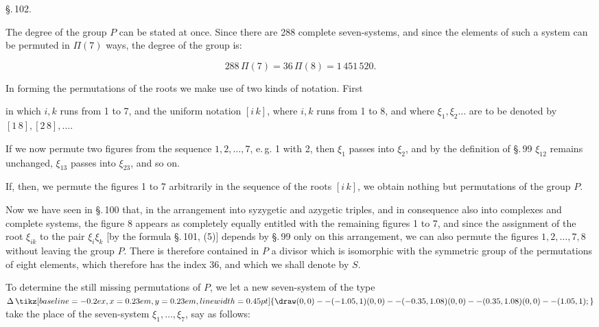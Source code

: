 \providecommand{\weberfourup}{\mathord{\tikz[baseline=-0.2ex,x=0.23em,y=0.23em,line width=0.45pt]{\draw (0,0)--(-1.05,1) (0,0)--(-0.35,1.08) (0,0)--(0.35,1.08) (0,0)--(1.05,1);}}}
\begin{center}
\S.\,102.

\end{center}

The degree of the group $P$ can be stated at once. Since there are 288 complete seven-systems, and since the elements of such a system can be permuted in $\Pi(7)$ ways, the degree of the group is:

\[
288\,\Pi(7) = 36\,\Pi(8) = 1\,451\,520.
\]

In forming the permutations of the roots we make use of two kinds of notation. First


in which $i,k$ runs from 1 to 7, and the uniform notation $[i\,k]$, where $i,k$ runs from 1 to 8, and where $\xi_1,\xi_2\dots$ are to be denoted by $[1\,8],[2\,8],\dots$.

If we now permute two figures from the sequence $1,2,\dots,7$, e.\,g. 1 with 2, then $\xi_1$ passes into $\xi_2$, and by the definition of \S.\,99 $\xi_{12}$ remains unchanged, $\xi_{13}$ passes into $\xi_{23}$, and so on.

If, then, we permute the figures 1 to 7 arbitrarily in the sequence of the roots $[i\,k]$, we obtain nothing but permutations of the group $P$.

Now we have seen in \S.\,100 that, in the arrangement into syzygetic and azygetic triples, and in consequence also into complexes and complete systems, the figure 8 appears as completely equally entitled with the remaining figures 1 to 7, and since the assignment of the root $\xi_{ik}$ to the pair $\xi_i\xi_k$ [by the formula \S.\,101, (5)] depends by \S.\,99 only on this arrangement, we can also permute the figures $1,2,\dots,7,8$ without leaving the group $P$. There is therefore contained in $P$ a divisor which is isomorphic with the symmetric group of the permutations of eight elements, which therefore has the index 36, and which we shall denote by $S$.

To determine the still missing permutations of $P$, we let a new seven-system of the type $\Delta\,\weberfourup$ take the place of the seven-system $\xi_1,\dots,\xi_7$, say as follows:

